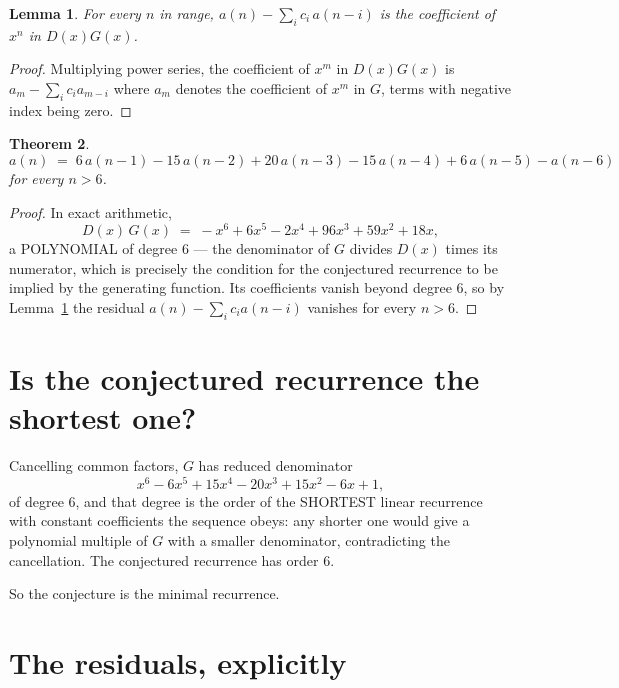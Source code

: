 \documentclass[11pt,a4paper]{article}
\theoremstyle{plain}
\newtheorem{theorem}{Theorem}
\newtheorem{lemma}[theorem]{Lemma}
\theoremstyle{definition}
\begin{document}
\begin{lemma}\label{lem:key}
For every $n$ in range, $a(n)-\sum_i c_i\,a(n-i)$ is the coefficient of $x^{n}$ in
$D(x)G(x)$.
\end{lemma}

\begin{proof}
Multiplying power series, the coefficient of $x^{m}$ in $D(x)G(x)$ is
$a_m-\sum_i c_i a_{m-i}$ where $a_m$ denotes the coefficient of $x^{m}$ in $G$, terms with
negative index being zero.
\end{proof}

\begin{theorem}
\[
a(n)\;=\;6\,a(n-1) - 15\,a(n-2) + 20\,a(n-3) - 15\,a(n-4) + 6\,a(n-5) - a(n-6)
\]
for every $n>6$.
\end{theorem}

\begin{proof}
In exact arithmetic,
\[
D(x)\,G(x)\;=\;- x^{6} + 6 x^{5} - 2 x^{4} + 96 x^{3} + 59 x^{2} + 18 x,
\]
a POLYNOMIAL of degree $6$ --- the denominator of $G$ divides $D(x)$ times its numerator,
which is precisely the condition for the conjectured recurrence to be implied by the
generating function. Its coefficients vanish beyond degree $6$, so by
Lemma~\ref{lem:key} the residual $a(n)-\sum_ic_ia(n-i)$ vanishes for every
$n>6$.
\end{proof}

\section{Is the conjectured recurrence the shortest one?}

Cancelling common factors, $G$ has reduced denominator
\[
x^{6} - 6 x^{5} + 15 x^{4} - 20 x^{3} + 15 x^{2} - 6 x + 1,
\]
of degree $6$, and that degree is the order of the SHORTEST linear recurrence with
constant coefficients the sequence obeys: any shorter one would give a polynomial multiple of
$G$ with a smaller denominator, contradicting the cancellation. The conjectured recurrence has
order $6$.

So the conjecture is the minimal recurrence.

\section{The residuals, explicitly}
\end{document}
